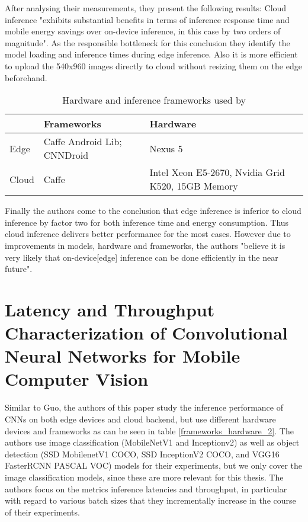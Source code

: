 After analysing their measurements, they present the following results:
Cloud inference "exhibits substantial benefits
in terms of inference response time and mobile energy savings
over on-device inference, in this case by two orders of magnitude". As the responsible bottleneck for this conclusion they identify the model loading and inference times during edge inference.
Also it is more efficient to upload the 540x960 images directly to cloud without resizing them on the edge beforehand.


\begin{table}[H]
\centering
\caption{Hardware and inference frameworks used by \cite{DBLP:conf/ic2e/Guo18}}
\begin{tabular}{@{}lll@{}}
\toprule
 & Frameworks & Hardware \\
 \midrule
Edge & Caffe Android Lib; CNNDroid & Nexus 5 \\
Cloud & Caffe & Intel Xeon E5-2670, Nvidia Grid K520, 15GB Memory\\
\bottomrule

\end{tabular}

\label{frameworks_hardware_1}
\end{table}
Finally the authors come to the conclusion that edge inference is inferior to cloud inference by factor two for both inference time and energy consumption. Thus cloud inference delivers better performance for the most cases. However due to improvements in models, hardware and frameworks, the authors "believe it is
very likely that on-device[edge] inference can be done efficiently in the near future". 
\section{Latency and Throughput Characterization of Convolutional
Neural Networks for Mobile Computer Vision}
Similar to Guo, the authors of this paper study the inference performance of CNNs on both edge devices and cloud backend, but use different hardware devices and frameworks as can be seen in table \ref{frameworks_hardware_2}. 
The authors use image classification (MobileNetV1 and Inceptionv2) as well as object detection (SSD MobilenetV1 COCO, SSD InceptionV2 COCO,
and VGG16 FasterRCNN PASCAL VOC) models for their experiments, but we only cover the image classification models, since these are more relevant for this thesis.
The authors focus on the metrics inference latencies and throughput, in particular with regard to various batch sizes that they incrementally increase in the course of their experiments.

